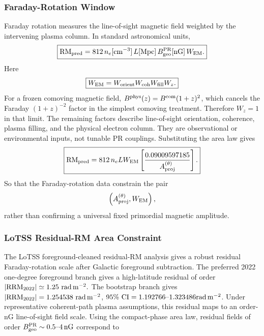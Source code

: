 \documentclass[11pt]{article}
\begin{document}
\subsubsection{Faraday-Rotation Window}

Faraday rotation measures the line-of-sight magnetic field weighted by the
intervening plasma column. In standard astronomical units,
\begin{equation}
\boxed{
{\rm RM}_{\rm pred}
=
812\,
n_e[{\rm cm^{-3}}]\,
L[{\rm Mpc}]\,
B_{\rm geo}^{\rm PR}[{\rm nG}]\,
W_{\rm EM}.
}
\end{equation}
Here
\begin{equation}
\boxed{
W_{\rm EM}
=
W_{\rm orient}
W_{\rm coh}
W_{\rm fill}
W_z .
}
\end{equation}
For a frozen comoving magnetic field, $B^{\rm phys}(z) = B^{\rm com}(1+z)^2$, which cancels the Faraday \((1+z)^{-2}\) factor in the simplest comoving treatment. Therefore \(W_z=1\) in that limit. The remaining factors describe line-of-sight orientation, coherence, plasma filling, and the physical electron
column. They are observational or environmental inputs, not tunable PR couplings. Substituting the area law gives
\begin{equation}
\boxed{
{\rm RM}_{\rm pred}
=
812\,
n_e L W_{\rm EM}
\left[
\frac{
0.09009597185
}{
A_{\rm proj}^{(\theta)}
}
\right].
}
\end{equation}
So that the Faraday-rotation data constrain the pair
\begin{equation}
\left(
A_{\rm proj}^{(\theta)},
W_{\rm EM}
\right),
\end{equation}
rather than confirming a universal fixed primordial magnetic amplitude.

\subsubsection{LoTSS Residual-RM Area Constraint}

The LoTSS \cite{Shimwell2019} foreground-cleaned residual-RM analysis gives a robust residual
Faraday-rotation scale after Galactic foreground subtraction. The preferred
2022 one-degree foreground branch gives a high-latitude residual of order $|{\rm RRM}_{2022}|
\simeq 1.25\ {\rm rad\,m^{-2}}.$ The bootstrap branch gives $|{\rm RRM}_{2022}| = 1.254538\ {\rm rad\,m^{-2}}$, $95\%{\rm\ CI}=1.192766\text{--}1.323486\\ {\rm rad\,m^{-2}}$. Under representative coherent-path plasma assumptions, this residual maps to an order-nG line-of-sight field scale. Using the compact-phase area law, residual fields of order  $B_{\rm geo}^{\rm PR} \sim 0.5\text{--}4\,{\rm nG}$ correspond to
\end{document}
